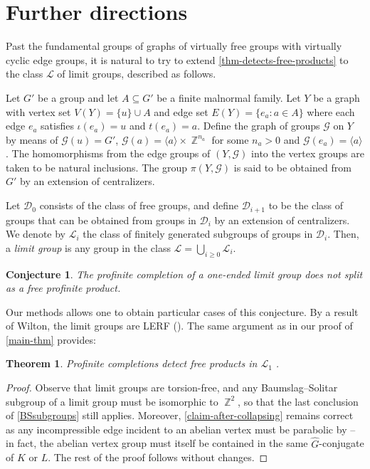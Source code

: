 \documentclass[a4paper]{amsart}
\newtheorem{teo}[lem]{Theorem}
\newtheorem{Conj}{Conjecture}
\theoremstyle{definition}
\theoremstyle{remark}
\DeclareMathOperator{\bbz}{\mathbb{Z}}
\newcommand{\G}{\mathcal G}
\begin{document}
\section{Further directions}\label{sect:limit}

Past the fundamental groups of graphs of virtually free groups with virtually cyclic edge groups, it is natural to try to extend \cref{thm-detects-free-products} to the class \(\mathcal{L}\) of limit groups, described as follows.

Let \(G'\) be a group and let \(A \subseteq G'\) be a finite malnormal family. Let \(Y\) be a graph with vertex set \(V(Y) = \{u\} \cup A\) and edge set \(E(Y) = \{e_a\colon a \in A\}\) where each edge \(e_a\) satisfies \(\iota(e_a) = u\) and \(t(e_a) = a\). Define the graph of groups \(\G\) on \(Y\) by means of \(\G(u) = G'\), \(\G(a) = \langle a \rangle \times \bbz^{n_a}\) for some \(n_a > 0\) and \(\G(e_a) = \langle a \rangle\). The homomorphisms from the edge groups of \((Y,\G)\) into the vertex groups are taken to be natural inclusions. The group \(\pi(Y,\G)\) is said to be obtained from \(G'\) by an extension of centralizers.

Let \(\mathcal{D}_0\) consists of the class of free groups, and define \(\mathcal{D}_{i+1}\) to be the class of groups that can be obtained from groups in \(\mathcal{D}_i\) by an extension of centralizers. We denote by \(\mathcal{L}_i\) the class of finitely generated subgroups of groups in \(\mathcal{D}_i\). Then, a \emph{limit group} is any group in the class \(\mathcal{L} = \bigcup_{i \geq 0} \mathcal{L}_i\).

\begin{Conj} The profinite completion of a one-ended limit group does not split as a free profinite product.\end{Conj}

Our methods allows one to obtain particular cases of this conjecture. By a result of Wilton, the limit groups are LERF (\cite{Wi08}). The same argument as in our proof of \cref{main-thm} provides:

\begin{teo}\label{limit1}
    Profinite completions detect free products in \( \mathcal{L}_1 \) .
\end{teo}
\begin{proof} Observe that limit groups are torsion-free, and any Baumslag--Solitar subgroup of a limit group must be isomorphic to \(\bbz^2\), so that the last conclusion of \cref{BSsubgroups} still applies. Moreover, \cref{claim-after-collapsing} remains correct as any incompressible edge incident to an abelian vertex must be parabolic by \cite[Prop. 4.2.9]{ribesProfiniteGraphsGroups2017} -- in fact, the abelian vertex group must itself be contained in the same \(\widehat{G}\)-conjugate of \(K\) or \(L\). The rest of the proof follows without changes. 
\end{proof}
\end{document}
